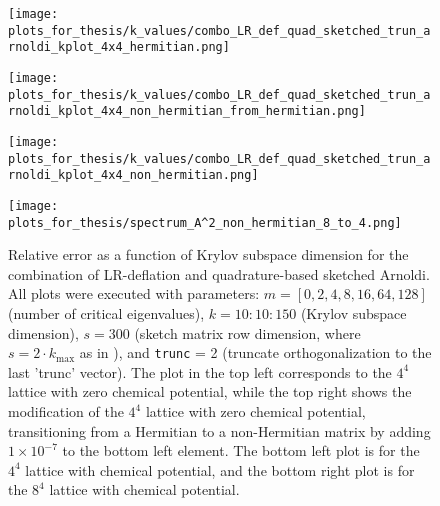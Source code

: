 \begin{figure}[H]
    \centering
    \begin{minipage}{0.45\textwidth}
        \centering
        \texttt{[image: plots\_for\_thesis/k\_values/combo\_LR\_def\_quad\_sketched\_trun\_arnoldi\_kplot\_4x4\_hermitian.png]} %
    \end{minipage}%
    \hspace{0.02\textwidth} %
    \begin{minipage}{0.45\textwidth}
        \centering
        \texttt{[image: plots\_for\_thesis/k\_values/combo\_LR\_def\_quad\_sketched\_trun\_arnoldi\_kplot\_4x4\_non\_hermitian\_from\_hermitian.png]} %
    \end{minipage}
    
    \vspace{0.02\textwidth} %
    
    \begin{minipage}{0.45\textwidth}
        \centering
        \texttt{[image: plots\_for\_thesis/k\_values/combo\_LR\_def\_quad\_sketched\_trun\_arnoldi\_kplot\_4x4\_non\_hermitian.png]} %
    \end{minipage}%
    \hspace{0.02\textwidth} %
    \begin{minipage}{0.45\textwidth}
        \centering
        \texttt{[image: plots\_for\_thesis/spectrum\_A^2\_non\_hermitian\_8\_to\_4.png]} %
    \end{minipage}
    
    \caption{\small Relative error as a function of Krylov subspace dimension for the combination of LR-deflation and quadrature-based sketched Arnoldi. All plots were executed with parameters: $m = [0, 2, 4, 8, 16, 64, 128]$ (number of critical eigenvalues), $k = 10:10:150$ (Krylov subspace dimension), $s = 300$ (sketch matrix row dimension, where $s = 2 \cdot k_{\text{max}}$ as in \cite{41}), and \texttt{trunc} = 2 (truncate orthogonalization to the last 'trunc' vector). The plot in the top left corresponds to the $4^4$ lattice with zero chemical potential, while the top right shows the modification of the $4^4$ lattice with zero chemical potential, transitioning from a Hermitian to a non-Hermitian matrix by adding $1 \times 10^{-7}$ to the bottom left element. The bottom left plot is for the $4^4$ lattice with chemical potential, and the bottom right plot is for the $8^4$ lattice with chemical potential.}
    \label{fig:combo_LR+skectched_arnoldi_k_plot}
\end{figure}

